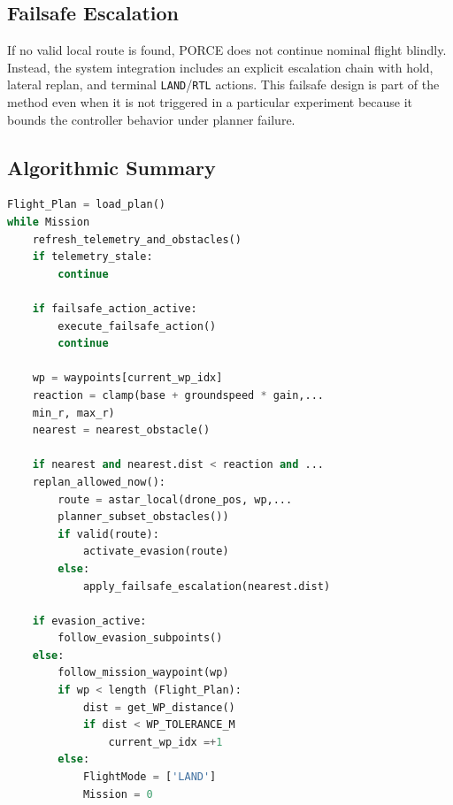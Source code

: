 \documentclass[journal,twoside,web]{ieeecolor}
\begin{document}

\subsection{Failsafe Escalation}

If no valid local route is found, PORCE does not continue nominal flight blindly. Instead, the system integration includes an explicit escalation chain with hold, lateral replan, and terminal \texttt{LAND}/\texttt{RTL} actions. This failsafe design is part of the method even when it is not triggered in a particular experiment because it bounds the controller behavior under planner failure.

\subsection{Algorithmic Summary}

\begin{lstlisting}[language=Python, caption=Simplified control loop for the proposed method]
Flight_Plan = load_plan()
while Mission
    refresh_telemetry_and_obstacles()
    if telemetry_stale:
        continue

    if failsafe_action_active:
        execute_failsafe_action()
        continue

    wp = waypoints[current_wp_idx]
    reaction = clamp(base + groundspeed * gain,...
    min_r, max_r)
    nearest = nearest_obstacle()

    if nearest and nearest.dist < reaction and ...
    replan_allowed_now():
        route = astar_local(drone_pos, wp,... 
        planner_subset_obstacles())
        if valid(route):
            activate_evasion(route)
        else:
            apply_failsafe_escalation(nearest.dist)

    if evasion_active:
        follow_evasion_subpoints()
    else:
        follow_mission_waypoint(wp)
        if wp < length (Flight_Plan): 
            dist = get_WP_distance()
            if dist < WP_TOLERANCE_M
                current_wp_idx =+1
        else: 
            FlightMode = ['LAND']
            Mission = 0

\end{lstlisting}
\end{document}
